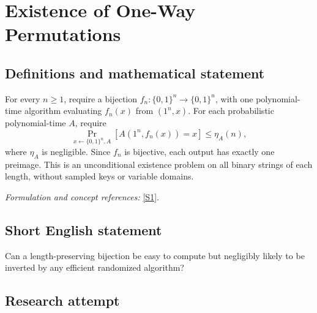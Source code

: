 \documentclass[11pt,a4paper]{article}
\newcommand{\sref}[2]{\hyperlink{source:#1:#2}{[S#2]}}
\newif\ifshowcatalogue
\newcommand{\cataloguescope}[1]{\ifshowcatalogue
 \paragraph{Exact scope in the supplied catalogue.}
 \begin{quote}\small #1\end{quote}\fi}
\numberwithin{equation}{section}
\begin{document}
\setcounter{section}{49}
\clearpage
\section{\texorpdfstring{Existence of One-Way Permutations}{Existence of One-Way Permutations}}\label{50}
\subsection{Definitions and mathematical statement}
For every $n\ge1$, require a bijection $f_n:\{0,1\}^n\to\{0,1\}^n$, with one polynomial-time algorithm evaluating $f_n(x)$ from $(1^n,x)$. For each probabilistic polynomial-time $A$, require
\[
 \Pr_{x\leftarrow\{0,1\}^n,A}[A(1^n,f_n(x))=x]\le\eta_A(n),
\]
where $\eta_A$ is negligible. Since $f_n$ is bijective, each output has exactly one preimage. This is an unconditional existence problem on all binary strings of each length, without sampled keys or variable domains.
\par\smallskip\textit{Formulation and concept references:} \sref{50}{1}.
\cataloguescope{There exists a family f\_n:\{0,1\}\textasciicircum{}n->\{0,1\}\textasciicircum{}n, n>=1, of bijections computed by one deterministic polynomial-time algorithm on (1\textasciicircum{}n,x), such that for every probabilistic polynomial-time algorithm A its inversion success Pr[A(1\textasciicircum{}n,f\_n(x))=x], over uniform x and A's coins, is negligible in n: for every c>0 it is at most n\textasciicircum{}(-c) for all sufficiently large n. This is unconditional existence in the classical unrelativized model, with no key sampling or variable domains.}
\subsection{Short English statement}
Can a length-preserving bijection be easy to compute but negligibly likely to be inverted by any efficient randomized algorithm?
\subsection{Research attempt}
\end{document}
